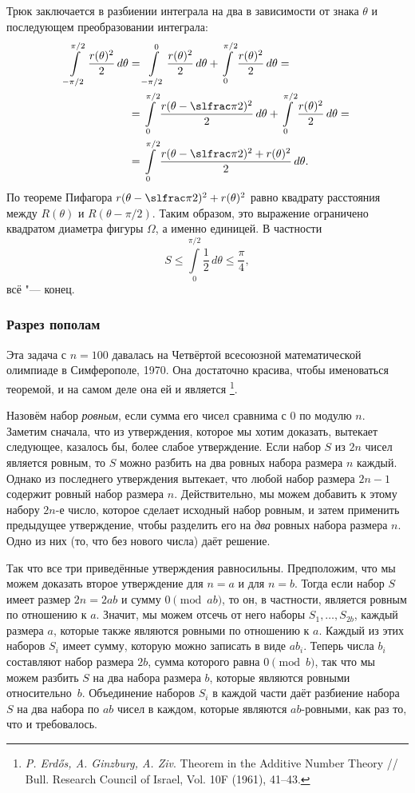 \documentclass[twoside]{book}
\begin{document}
Трюк заключается в разбиении интеграла на два в зависимости от знака $\theta$ и последующем преобразовании интеграла:
\begin{align*}
\int\limits_{-\pi/2}^{\pi/2}\frac{r(\theta)^2}{2}\,d\theta&=\int\limits_{-\pi/2}^{0}\frac{r(\theta)^2}{2}\,d\theta+\int\limits_{0}^{\pi/2}\frac{r(\theta)^2}{2}\,d\theta=
\\
&=\int\limits_{0}^{\pi/2}\frac{r(\theta-\slfrac\pi2)^2}{2}\,d\theta+\int\limits_{0}^{\pi/2}\frac{r(\theta)^2}{2}\,d\theta=
\\
&=\int\limits_{0}^{\pi/2}\frac{r(\theta-\slfrac\pi2)^2+r(\theta)^2}{2}\,d\theta.
\end{align*}
По теореме Пифагора $r(\theta-\slfrac\pi2)^2+r(\theta)^2$ равно квадрату расстояния между $R(\theta)$ и $R(\theta- \pi/2)$.
Таким образом, это выражение ограничено квадратом диаметра фигуры $\Omega$, а именно единицей.
В частности
\[S\le \int\limits_{0}^{\pi/2}\frac12\,d\theta\le\frac\pi4,
\]
всё "--- конец.
\heart

\subsubsection*{Разрез пополам}

Эта задача с $n=100$ давалась на Четвёртой всесоюзной математической олимпиаде в Симферополе, 1970.
Она достаточно красива, чтобы именоваться теоремой, и на самом деле она ей и является%
\footnote{\emph{P. Erd\H{o}s, A. Ginzburg, A. Ziv}. Theorem in the Additive Number Theory /\!/ {Bull. Research Council of Israel}, Vol. 10F (1961), 41--43.}.

\medskip

Назовём набор \emph{ровным}, если сумма его чисел сравнима с $0$ по модулю $n$.
Заметим сначала, что из утверждения, которое мы хотим доказать, вытекает следующее, казалось бы, более слабое утверждение. 
Если набор $S$ из $2n$ чисел является ровным, то $S$ можно разбить на два ровных набора размера $n$ каждый.
Однако из последнего утверждения вытекает, что любой набор размера $2n-1$ содержит ровный набор размера $n$.
Действительно, мы можем добавить к этому набору $2n$-е число, которое сделает исходный набор ровным, и затем применить предыдущее утверждение, чтобы разделить его на \emph{два} ровных набора размера $n$. 
Одно из них (то, что без нового числа) даёт решение.

Так что все три приведённые утверждения равносильны.
Предположим, что мы можем доказать второе утверждение для $n = a$ и для $n = b$.
Тогда если набор $S$ имеет размер $2n = 2ab$ и сумму $0 \pmod {ab}$, то он, в частности, является ровным по отношению к $a$. 
Значит, мы можем отсечь от него наборы $S_1,\dots,S_{2b}$, каждый размера $a$, которые также являются ровными по отношению к $a$.
Каждый из этих наборов $S_i$ имеет сумму, которую можно записать в виде $ab_i$.
Теперь числа $b_i$ составляют набор размера $2b$, сумма которого равна $0 \pmod b$, так что мы можем разбить $S$ на два набора размера $b$, которые являются ровными относительно~$b$.
Объединение наборов $S_i$ в каждой части даёт разбиение набора $S$ на два набора по $ab$ чисел в каждом, которые являются $ab$-ровными, как раз то, что и требовалось.
\end{document}
